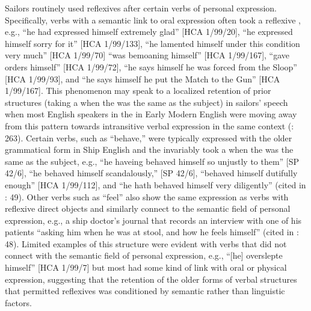Sailors routinely used reflexives after certain verbs of personal expression. Specifically, verbs with a semantic link to oral expression often took a reflexive , e.g., “he had expressed himself extremely glad” [HCA 1/99/20], “he expressed himself sorry for it” [HCA 1/99/133], “he lamented himself under this condition very much” [HCA 1/99/70] “was bemoaning himself” [HCA 1/99/167], “gave orders himself” [HCA 1/99/72], “he says himself he was forced from the Sloop” [HCA 1/99/93], and “he says himself he put the Match to the Gun” [HCA 1/99/167]. This phenomenon may speak to a localized retention of prior  structures (taking a  when the  was the same as the subject) in sailors’ speech when most English speakers in the in Early Modern English were moving away from this pattern towards intransitive verbal expression in the same context (\citealt{MillwardHayes2012}: 263). Certain verbs, such as “behave,” were typically expressed with the older  grammatical form in Ship English and the  invariably took a  when the  was the same as the subject, e.g., “he haveing behaved himself so unjustly to them” [SP 42/6], “he behaved himself scandalously,” [SP 42/6], “behaved himself dutifully enough” [HCA 1/99/112], and “he hath behaved himself very diligently” (cited in \citealt{Brown2011}: 49). Other verbs such as “feel” also show the same expression as  verbs with reflexive direct objects and similarly connect to the semantic field of personal expression, e.g., a ship doctor’s journal that records an interview with one of his patients “asking him when he was at stool, and how he feels himself” (cited in \citealt{Brown2011}: 48). Limited examples of this structure were evident with verbs that did not connect with the semantic field of personal expression, e.g., “[he] overslepte himself” [HCA 1/99/7] but most had some kind of link with oral or physical expression, suggesting that the retention of the older forms of  verbal structures that permitted reflexives was conditioned by semantic rather than linguistic factors. 

